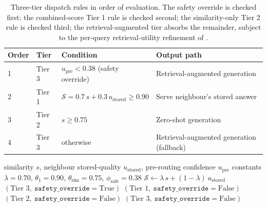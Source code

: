 \begin{table}[!htbp]
\centering
\small
\begin{tabular}{@{}p{0.6cm}p{1.0cm}p{6.5cm}p{4.5cm}@{}}
\toprule
\textbf{Order} & \textbf{Tier} & \textbf{Condition} & \textbf{Output path} \\
\midrule
1 & Tier 3 & $u_{\text{pre}} < 0.38$ (safety override) & Retrieval-augmented generation \\
2 & Tier 1 & $\mathcal{S} = 0.7\,s + 0.3\,u_{\text{stored}} \ge 0.90$ & Serve neighbour's stored answer \\
3 & Tier 2 & $s \ge 0.75$ & Zero-shot generation \\
4 & Tier 3 & otherwise & Retrieval-augmented generation (fallback) \\
\bottomrule
\end{tabular}
\caption[Three-tier dispatch rules in order of evaluation.]{Three-tier dispatch rules in order of evaluation. The safety override is checked first; the combined-score Tier 1 rule is checked second; the similarity-only Tier 2 rule is checked third; the retrieval-augmented tier absorbs the remainder, subject to the per-query retrieval-utility refinement of .}
\label{tab:dispatch-rules}
\end{table}

\begin{algorithm}[!htbp]
\caption[Three-tier router with safety override (Stage~3).]{Three-tier router with safety override (Stage~3).}
\label{alg:router}
\begin{algorithmic}[1]
\Require similarity $s$, neighbour stored-quality $u_{\text{stored}}$, pre-routing confidence $u_{\text{pre}}$
\Require constants $\lambda = 0.70$, $\theta_{1} = 0.90$, $\theta_{\text{sim}} = 0.75$, $\phi_{\text{safe}} = 0.38$
\State $\mathcal{S} \gets \lambda\, s + (1-\lambda)\, u_{\text{stored}}$ 
    \State \Return $(\text{Tier 3},\ \texttt{safety\_override} = \text{True})$ 
    \State \Return $(\text{Tier 1},\ \texttt{safety\_override} = \text{False})$
    \State \Return $(\text{Tier 2},\ \texttt{safety\_override} = \text{False})$
\Else
    \State \Return $(\text{Tier 3},\ \texttt{safety\_override} = \text{False})$ 
\EndIf
\end{algorithmic}
\end{algorithm}

